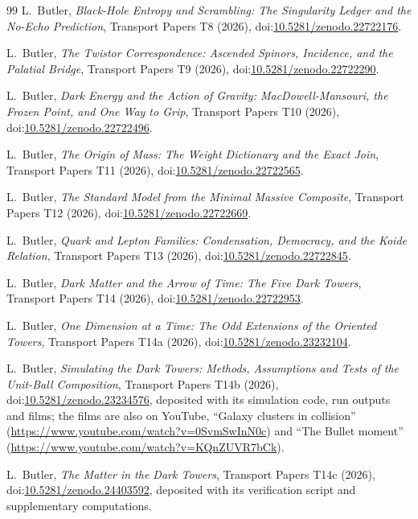 \documentclass[11pt]{article}
\theoremstyle{definition}
\begin{document}
\begin{thebibliography}{99}
L.~Butler,
\emph{Black-Hole Entropy and Scrambling: The Singularity Ledger and the No-Echo Prediction},
Transport Papers T8 (2026), doi:\href{https://doi.org/10.5281/zenodo.22722176}{10.5281/zenodo.22722176}.

L.~Butler,
\emph{The Twistor Correspondence: Ascended Spinors, Incidence, and the Palatial Bridge},
Transport Papers T9 (2026), doi:\href{https://doi.org/10.5281/zenodo.22722290}{10.5281/zenodo.22722290}.

L.~Butler,
\emph{Dark Energy and the Action of Gravity: MacDowell-Mansouri, the Frozen Point, and One Way to Grip},
Transport Papers T10 (2026), doi:\href{https://doi.org/10.5281/zenodo.22722496}{10.5281/zenodo.22722496}.

L.~Butler,
\emph{The Origin of Mass: The Weight Dictionary and the Exact Join},
Transport Papers T11 (2026), doi:\href{https://doi.org/10.5281/zenodo.22722565}{10.5281/zenodo.22722565}.

L.~Butler,
\emph{The Standard Model from the Minimal Massive Composite},
Transport Papers T12 (2026), doi:\href{https://doi.org/10.5281/zenodo.22722669}{10.5281/zenodo.22722669}.

L.~Butler,
\emph{Quark and Lepton Families: Condensation, Democracy, and the Koide Relation},
Transport Papers T13 (2026), doi:\href{https://doi.org/10.5281/zenodo.22722845}{10.5281/zenodo.22722845}.

L.~Butler,
\emph{Dark Matter and the Arrow of Time: The Five Dark Towers},
Transport Papers T14 (2026), doi:\href{https://doi.org/10.5281/zenodo.22722953}{10.5281/zenodo.22722953}.

L.~Butler,
\emph{One Dimension at a Time: The Odd Extensions of the Oriented Towers},
Transport Papers T14a (2026), doi:\href{https://doi.org/10.5281/zenodo.23232104}{10.5281/zenodo.23232104}.

L.~Butler,
\emph{Simulating the Dark Towers: Methods, Assumptions and Tests of the Unit-Ball Composition},
Transport Papers T14b (2026), doi:\href{https://doi.org/10.5281/zenodo.23234576}{10.5281/zenodo.23234576}, deposited with its simulation code, run outputs and films; the films are also on YouTube, ``Galaxy clusters in collision'' (\url{https://www.youtube.com/watch?v=0SvmSwInN0c}) and ``The Bullet moment'' (\url{https://www.youtube.com/watch?v=KQnZUVR7bCk}).

L.~Butler,
\emph{The Matter in the Dark Towers},
Transport Papers T14c (2026), doi:\href{https://doi.org/10.5281/zenodo.24403592}{10.5281/zenodo.24403592}, deposited with its verification script and supplementary computations.


\end{thebibliography}
\end{document}
